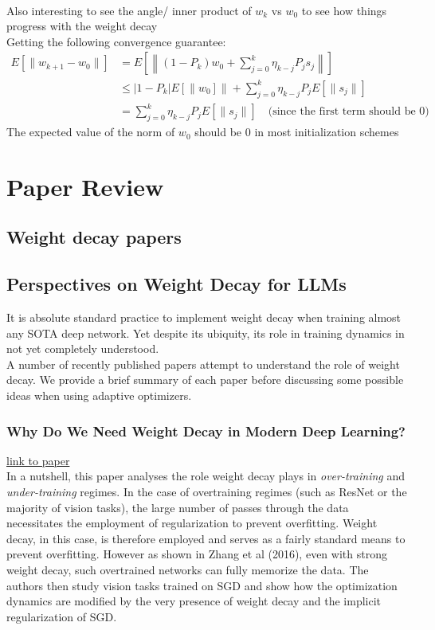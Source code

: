 \documentclass[12pt]{book}
\begin{document}
\\
Also interesting to see the angle/ inner product of $w_k$ vs  $w_0$ to see how things progress with the weight decay \\
Getting the following convergence guarantee:
\begin{align*}
	E\left[ \|w_{k+1} - w_0 \|\right] &= E\left[ \left\|(1 - P_k)w_0 + \sum_{j=0}^{k} {\eta_{k-j}P_js_j} \right\| \right] \\
					  &\le |1 - P_k|E[\|w_0]\| + \sum_{j=0}^{k} {\eta_{k-j}P_j E[\|s_j\|]}  \\
					  &= \sum_{j=0}^{k} {\eta_{k-j}P_j E[\|s_j\|]}  \quad (\text{since the first term should be 0) }
\end{align*}
The expected value of the norm of $w_0$ should be 0 in most initialization schemes
\chapter{Paper Review}



\section{Weight decay papers}

\section*{Perspectives on Weight Decay for LLMs}
It is absolute standard practice to implement weight decay when training almost any SOTA deep network. Yet despite its ubiquity, its role in training dynamics in not yet completely understood. \\
A number of recently published papers attempt to understand the role of weight decay. We provide a brief summary of each paper before discussing some possible ideas when using adaptive optimizers. 
\\
\subsection*{Why Do We Need Weight Decay
in Modern Deep Learning?}
\href{https://arxiv.org/pdf/2310.04415}{link to paper}\\
In a nutshell, this paper analyses the role weight decay plays in \emph{over-training} and \emph{under-training} regimes. In the case of overtraining regimes (such as ResNet or the majority of vision tasks), the large number of passes through the data necessitates the employment of regularization to prevent overfitting. Weight decay, in this case, is therefore employed and serves as a fairly standard means to prevent overfitting. However as shown in Zhang et al (2016), even with strong weight decay, such overtrained networks can fully memorize the data. The authors then study vision tasks trained on SGD and show how the optimization dynamics are modified by the very presence of weight decay and the implicit regularization of SGD. 
\end{document}

